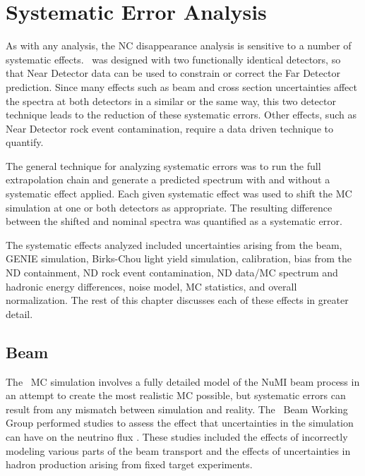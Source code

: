 \chapter{Systematic Error Analysis}
\label{ch:Systs}

As with any analysis, the NC disappearance analysis is sensitive to a number of systematic effects. \nova~was designed with two functionally identical detectors, so that Near Detector data can be used to constrain or correct the Far Detector prediction. Since many effects such as beam and cross section uncertainties affect the spectra at both detectors in a similar or the same way, this two detector technique leads to the reduction of these systematic errors. Other effects, such as Near Detector rock event contamination, require a data driven technique to quantify.

The general technique for analyzing systematic errors was to run the full extrapolation chain and generate a predicted spectrum with and without a systematic effect applied. Each given systematic effect was used to shift the MC simulation at one or both detectors as appropriate. The resulting difference between the shifted and nominal spectra was quantified as a systematic error.

The systematic effects analyzed included uncertainties arising from the beam, GENIE simulation, Birks-Chou light yield simulation, calibration, bias from the ND containment, ND rock event contamination, ND data/MC spectrum and hadronic energy differences, noise model, MC statistics, and overall normalization. The rest of this chapter discusses each of these effects in greater detail.

\section{Beam}

The \nova~MC simulation involves a fully detailed model of the NuMI beam process in an attempt to create the most realistic MC possible, but systematic errors can result from any mismatch between simulation and reality. The \nova~Beam Working Group performed studies to assess the effect that uncertainties in the simulation can have on the neutrino flux \cite{ref:TNBeam}. These studies included the effects of incorrectly modeling various parts of the beam transport and the effects of uncertainties in hadron production arising from fixed target experiments.

